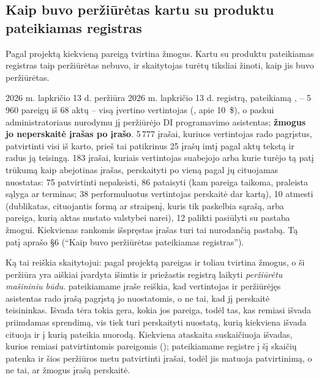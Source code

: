 \subsection{Kaip buvo peržiūrėtas kartu su produktu pateikiamas registras}\label{sec:control:shipped}

Pagal projektą kiekvieną pareigą tvirtina žmogus. Kartu su produktu pateikiamas registras
taip peržiūrėtas nebuvo, ir skaitytojas turėtų tiksliai žinoti, kaip jis buvo peržiūrėtas.

\begin{notebox}{2026 m. lapkričio 13 d. peržiūra}
2026 m. lapkričio 13 d. registrą, pateikiamą , -- 5\,960
pareigų iš 68 aktų -- visą įvertino vertintojas (, apie
10~\$), o paskui administratoriaus nurodymu jį peržiūrėjo DI programavimo asistentas;
\textbf{žmogus jo neperskaitė įrašas po įrašo}. 5\,777 įrašai, kuriuos vertintojas rado
pagrįstus, patvirtinti visi iš karto, prieš tai patikrinus 25 įrašų imtį pagal aktų tekstą ir radus
ją teisingą. 183 įrašai, kuriais vertintojas suabejojo arba kurie turėjo tą patį trūkumą kaip
abejotinas įrašas, perskaityti po vieną pagal jų cituojamas nuostatas: 75 patvirtinti
nepakeisti, 86 pataisyti (kam pareiga taikoma, praleista sąlyga ar terminas; 38 performuluotus
vertintojas perskaitė dar kartą), 10 atmesti (dublikatas, cituojantis formą ar straipsnį,
kuris tik paskelbia sąrašą, arba pareiga, kurią aktas nustato valstybei narei), 12 palikti
pasiūlyti su pastaba žmogui. Kiekvienas rankomis išspręstas įrašas turi tai nurodančią
pastabą. Tą patį aprašo  §6 (\enquote{Kaip buvo peržiūrėtas
pateikiamas registras}).
\end{notebox}

Ką tai reiškia skaitytojui: pagal projektą pareigas ir toliau tvirtina žmogus, o ši
peržiūra yra aiškiai įvardyta išimtis ir priežastis registrą laikyti \emph{peržiūrėtu
mašininiu būdu}.  pateikiamame įraše reiškia, kad vertintojas ir peržiūrėjęs
asistentas rado įrašą pagrįstą jo nuostatomis, o ne tai, kad jį perskaitė teisininkas.
Išvada tėra tokia gera, kokia jos pareiga, todėl tas, kas remiasi išvada priimdamas
sprendimą, vis tiek turi perskaityti nuostatą, kurią kiekviena išvada cituoja ir į kurią
pateikia nuorodą. Kiekviena ataskaita suskaičiuoja išvadas, kurios remiasi patvirtintomis
pareigomis (); pateikiamame registre į šį skaičių patenka ir šios
peržiūros metu patvirtinti įrašai, todėl jis matuoja patvirtinimą, o ne tai, ar žmogus įrašą
perskaitė.



